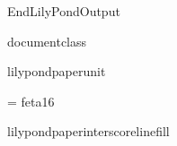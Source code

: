 %
%
%
\edef\lilyponddefsELC{\the\endlinechar}%
\relax

\def\ifundefined#1{
  \expandafter\ifx\csname#1\endcsname\relax
}


\ifx\mustmakelilypondtitle\undefined
\else
  \makelilypondtitle
\fi

\ifx\mustmakelilypondpiecetitle\undefined
\else
  \makelilypondpiecetitle
\fi


\def\SkipLilydefs{
  \endlinechar \lilyponddefsELC
  \endinput}
\ifundefined{EndLilyPondOutput}
  \def\EndLilyPondOutput{\csname bye\endcsname}
  \def\SkipLilydefs{}
\fi
\SkipLilydefs


\ifundefined{documentclass}
  

  \ifundefined{lilypondpaperunit}
  \else
    \ifdim0pt<\lilypondpaperlinewidth\lilypondpaperunit
      \hsize=\lilypondpaperlinewidth\lilypondpaperunit
    \fi
  \fi
\else
  
\fi



\font\fetasixteen = feta16
\def\fetafont{\fetasixteen}
\def\fetachar#1{\hbox{\fetasixteen#1}}

\def\botalign#1{
  \vbox to 0pt{\vss #1}
}
\def\leftalign#1{
  \hbox to 0pt{#1\hss}
}


%
%

\def\myfilbreak{}%


\ifundefined{lilypondpaperinterscorelinefill}
  \def\lilypondpaperinterscorelinefill{0}
\else
  \def\lilypondpaperinterscorelinefill{1}
\fi

\def\interscoreline{
  \vskip \lilypondpaperinterscoreline \lilypondpaperunit
    plus \lilypondpaperinterscorelinefill fill
}

\def\placebox#1#2#3{
  \botalign{
    \hbox{\raise #1\leftalign{\kern #2{}#3}}
  }
}

